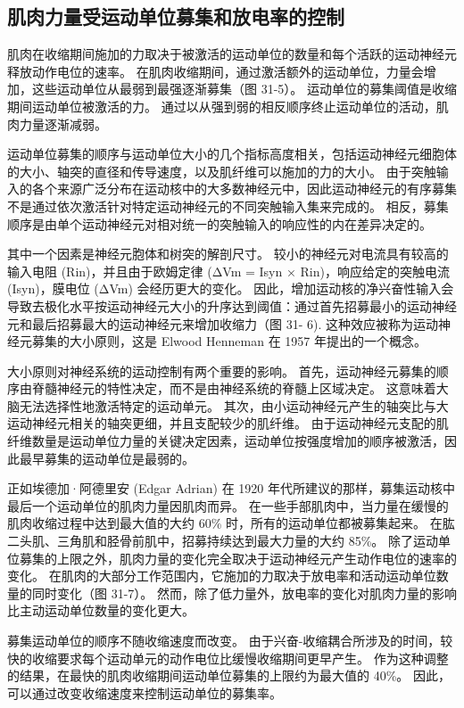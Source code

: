 \subsection{肌肉力量受运动单位募集和放电率的控制}
肌肉在收缩期间施加的力取决于被激活的运动单位的数量和每个活跃的运动神经元释放动作电位的速率。 在肌肉收缩期间，通过激活额外的运动单位，力量会增加，这些运动单位从最弱到最强逐渐募集（图 31-5）。 运动单位的募集阈值是收缩期间运动单位被激活的力。 通过以从强到弱的相反顺序终止运动单位的活动，肌肉力量逐渐减弱。

运动单位募集的顺序与运动单位大小的几个指标高度相关，包括运动神经元细胞体的大小、轴突的直径和传导速度，以及肌纤维可以施加的力的大小。 由于突触输入的各个来源广泛分布在运动核中的大多数神经元中，因此运动神经元的有序募集不是通过依次激活针对特定运动神经元的不同突触输入集来完成的。 相反，募集顺序是由单个运动神经元对相对统一的突触输入的响应性的内在差异决定的。

其中一个因素是神经元胞体和树突的解剖尺寸。 较小的神经元对电流具有较高的输入电阻 (Rin)，并且由于欧姆定律 (ΔVm = Isyn × Rin)，响应给定的突触电流 (Isyn)，膜电位 (ΔVm) 会经历更大的变化。 因此，增加运动核的净兴奋性输入会导致去极化水平按运动神经元大小的升序达到阈值：通过首先招募最小的运动神经元和最后招募最大的运动神经元来增加收缩力（图 31- 6). 这种效应被称为运动神经元募集的大小原则，这是 Elwood Henneman 在 1957 年提出的一个概念。

大小原则对神经系统的运动控制有两个重要的影响。 首先，运动神经元募集的顺序由脊髓神经元的特性决定，而不是由神经系统的脊髓上区域决定。 这意味着大脑无法选择性地激活特定的运动单元。 其次，由小运动神经元产生的轴突比与大运动神经元相关的轴突更细，并且支配较少的肌纤维。 由于运动神经元支配的肌纤维数量是运动单位力量的关键决定因素，运动单位按强度增加的顺序被激活，因此最早募集的运动单位是最弱的。

正如埃德加·阿德里安 (Edgar Adrian) 在 1920 年代所建议的那样，募集运动核中最后一个运动单位的肌肉力量因肌肉而异。 在一些手部肌肉中，当力量在缓慢的肌肉收缩过程中达到最大值的大约 60\% 时，所有的运动单位都被募集起来。 在肱二头肌、三角肌和胫骨前肌中，招募持续达到最大力量的大约 85\%。 除了运动单位募集的上限之外，肌肉力量的变化完全取决于运动神经元产生动作电位的速率的变化。 在肌肉的大部分工作范围内，它施加的力取决于放电率和活动运动单位数量的同时变化（图 31-7）。 然而，除了低力量外，放电率的变化对肌肉力量的影响比主动运动单位数量的变化更大。

募集运动单位的顺序不随收缩速度而改变。 由于兴奋-收缩耦合所涉及的时间，较快的收缩要求每个运动单元的动作电位比缓慢收缩期间更早产生。 作为这种调整的结果，在最快的肌肉收缩期间运动单位募集的上限约为最大值的 40\%。 因此，可以通过改变收缩速度来控制运动单位的募集率。


